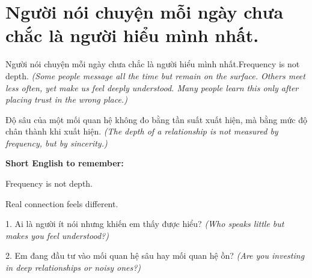 \section{Người nói chuyện mỗi ngày chưa chắc là người hiểu mình nhất.}
\begin{truyen}{Người nói chuyện mỗi ngày chưa chắc là người hiểu mình nhất.}{Frequency is not depth.}
\textit{(Some people message all the time but remain on the surface. Others meet less often, yet make us feel deeply understood. Many people learn this only after placing trust in the wrong place.)}
\end{truyen}
\begin{baihoc}
Độ sâu của một mối quan hệ không đo bằng tần suất xuất hiện, mà bằng mức độ chân thành khi xuất hiện.
\textit{(The depth of a relationship is not measured by frequency, but by sincerity.)}
\end{baihoc}
\begin{ghinhoanh}
\textbf{Short English to remember:}

Frequency is not depth.

Real connection feels different.
\end{ghinhoanh}
\begin{tuhocnhanh}
1. Ai là người ít nói nhưng khiến em thấy được hiểu? \textit{(Who speaks little but makes you feel understood?)}

2. Em đang đầu tư vào mối quan hệ sâu hay mối quan hệ ồn? \textit{(Are you investing in deep relationships or noisy ones?)}
\end{tuhocnhanh}
\ngancach

